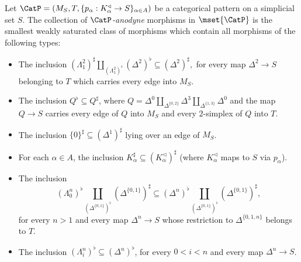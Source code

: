 \begin{definition}\label{postspunt}
Let $\CatP = (M_S, T, \{ p_{\alpha}: K_{\alpha}^{\triangleleft} \rightarrow S\}_{\alpha \in A})$
be a categorical pattern on a simplicial set $S$. The collection of {\it $\CatP$-anodyne} morphisms in $\mset{ \CatP}$ is the smallest weakly saturated class of morphisms which contain all morphisms of the following types:

\begin{itemize}

\item[$(A_0)$] The inclusion $( \Lambda^2_1)^{\sharp} \coprod_{ (\Lambda^2_{1})^{\flat}} (\Delta^2)^{\flat}  \subseteq (\Delta^2)^{\sharp},$ for every map $\Delta^2 \rightarrow S$ belonging to $T$ which carries every edge into $M_S$.

\item[$(A_1)$] The inclusion $Q^{\flat} \subseteq Q^{\sharp}$, where
$Q = \Delta^0 \coprod_{ \Delta^{ \{0,2\} }} \Delta^3 \coprod_{ \Delta^{ \{1,3\} }} \Delta^0$
and the map $Q \rightarrow S$ carries every edge of $Q$ into $M_S$ and every $2$-simplex
of $Q$ into $T$.


\item[$(B_0)$] The inclusion $\{0\}^{\sharp} \subseteq (\Delta^1)^{\sharp}$ lying over an
edge of $M_S$.

\item[$(B_1)$] For each $\alpha \in A$, the inclusion $K_{\alpha}^{\sharp} \subseteq
(K_{\alpha}^{\triangleleft})^{\sharp}$ (where $K_{\alpha}^{\triangleleft}$ maps to $S$ via
$p_{\alpha}$).

\item[$(C_0)$] The inclusion 
$$ (\Lambda^n_0)^{\flat} \coprod_{ (\Delta^{ \{0,1\} })^{\flat} } ( \Delta^{ \{0,1\} })^{\sharp}
\subseteq ( \Delta^n )^{\flat} \coprod_{ ( \Delta^{ \{0,1\} })^{\flat} } ( \Delta^{ \{0,1\} })^{\sharp},$$
for every $n > 1$ and every map $\Delta^n \rightarrow S$ whose restriction to
$\Delta^{ \{0, 1, n\} }$ belongs to $T$.

\item[$(C_1)$]  The inclusion $(\Lambda^{n}_i)^{\flat} \subseteq (\Delta^n)^{\flat}$, for every $0 < i < n$ and every map $\Delta^n \rightarrow S$. 


\end{itemize}
\end{definition}
